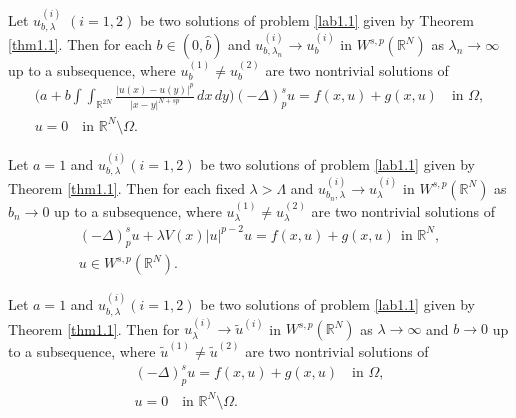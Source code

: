 \documentclass[reqno]{amsart}
\begin{document}
\begin{theorem} \label{thm1.2}
Let $u^{(i)}_{b,\lambda}$ $(i=1,2)$ be two solutions of problem \eqref{lab1.1} 
given by Theorem \ref{thm1.1}. Then for each $b\in(0, \widehat{b})$ and 
$u^{(i)}_{b,\lambda_n}\to  u_b^{(i)}$ in $W^{s,p}(\mathbb{R}^N)$ as 
$\lambda_n\to \infty$ up to a subsequence, where $u_b^{(1)}\neq u_b^{(2)}$ are 
two nontrivial solutions of
\begin{equation}\label{lab1.4}
\begin{gathered}
\Big(a+b\int\int_{\mathbb{R}^{2N}}\frac{|u(x)-u(y)|^p}{|x-y|^{N+sp}}\,dx\,dy\Big)
(-\Delta)_p^su=f(x,u)+g(x,u)\quad \text{in }\Omega,\\
u=0\quad \text{in }\mathbb{R}^N\setminus\Omega.
\end{gathered}
\end{equation}
\end{theorem}

\begin{theorem} \label{thm1.3}
Let $a=1$ and $u^{(i)}_{b,\lambda} (i=1,2)$ be two solutions of problem 
\eqref{lab1.1} given by Theorem \ref{thm1.1}. Then for each fixed $\lambda>\Lambda$
and $u^{(i)}_{b_n,\lambda}\to  u_\lambda^{(i)}$ in $W^{s,p}(\mathbb{R}^N)$ as 
$b_n\to 0$  up to a subsequence, where $u_\lambda^{(1)}\neq u_\lambda^{(2)}$ are 
two nontrivial solutions of
\begin{equation}\label{lab1.5}
\begin{gathered}
(-\Delta)_p^su+\lambda V(x)|u|^{p-2}u=f(x,u)+g(x,u)\ \ \text{in }\mathbb{R}^N,\\
u\in W^{s,p}(\mathbb{R}^N).
\end{gathered}
\end{equation}
\end{theorem}

\begin{theorem} \label{thm1.4}
Let $a=1$ and $u^{(i)}_{b,\lambda} (i=1,2)$ be two solutions of problem 
\eqref{lab1.1} given by Theorem \ref{thm1.1}. Then for 
$u^{(i)}_\lambda\to  \widetilde{u}^{(i)}$ in $W^{s,p}(\mathbb{R}^N)$ as 
$\lambda\to \infty$ and $b\to 0$ up to a subsequence, where 
$\widetilde{u}^{(1)}\neq \widetilde{u}^{(2)}$ are two nontrivial solutions of
\begin{gather*}
(-\Delta)_p^su=f(x,u)+g(x,u)\quad \text{in }\Omega,\\
u=0\quad \text{in }\mathbb{R}^N\setminus\Omega.
\end{gather*}
\end{theorem}
\end{document}
